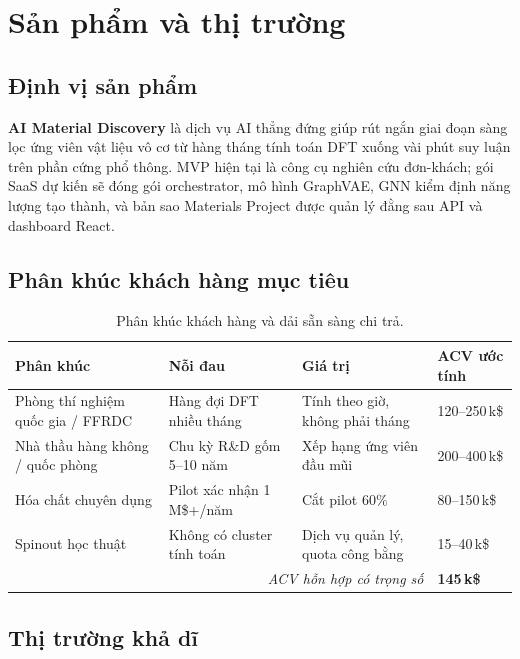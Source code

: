 \documentclass[11pt,a4paper]{report}
\begin{document}
\chapter{Sản phẩm và thị trường}

\section{Định vị sản phẩm}

\textbf{AI Material Discovery} là dịch vụ AI thẳng đứng giúp rút ngắn giai đoạn sàng lọc ứng
viên vật liệu vô cơ từ hàng tháng tính toán DFT xuống vài phút suy luận trên phần cứng phổ
thông. MVP hiện tại là công cụ nghiên cứu đơn-khách; gói SaaS dự kiến sẽ đóng gói orchestrator,
mô hình GraphVAE, GNN kiểm định năng lượng tạo thành, và bản sao Materials Project được quản
lý đằng sau API và dashboard React.

\section{Phân khúc khách hàng mục tiêu}

\begin{table}[h]
\centering
\caption{Phân khúc khách hàng và dải sẵn sàng chi trả.}
\label{tab:segments}
\begin{tabular}{p{4.0cm}p{4.2cm}p{3.5cm}p{2.5cm}}
\toprule
\textbf{Phân khúc} & \textbf{Nỗi đau} & \textbf{Giá trị} & \textbf{ACV ước tính} \\
\midrule
Phòng thí nghiệm quốc gia / FFRDC & Hàng đợi DFT nhiều tháng & Tính theo giờ, không phải tháng & 120--250\,k\$ \\
Nhà thầu hàng không / quốc phòng & Chu kỳ R\&D gốm 5--10 năm & Xếp hạng ứng viên đầu mũi & 200--400\,k\$ \\
Hóa chất chuyên dụng & Pilot xác nhận 1\,M\$+/năm & Cắt pilot 60\% & 80--150\,k\$ \\
Spinout học thuật & Không có cluster tính toán & Dịch vụ quản lý, quota công bằng & 15--40\,k\$ \\
\midrule
\multicolumn{3}{r}{\textit{ACV hỗn hợp có trọng số}} & \textbf{145\,k\$} \\
\bottomrule
\end{tabular}
\end{table}

\section{Thị trường khả dĩ}
\end{document}
